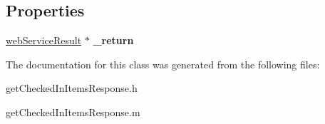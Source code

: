 \subsection*{Properties}
\begin{DoxyCompactItemize}
\item 
\hypertarget{interfaceget_checked_in_items_response_a16f5a028fc3f8d058b49b048bc9b56ba}{}\hyperlink{interfaceweb_service_result}{web\+Service\+Result} $\ast$ {\bfseries \+\_\+return}\label{interfaceget_checked_in_items_response_a16f5a028fc3f8d058b49b048bc9b56ba}

\end{DoxyCompactItemize}


The documentation for this class was generated from the following files\+:\begin{DoxyCompactItemize}
\item 
get\+Checked\+In\+Items\+Response.\+h\item 
get\+Checked\+In\+Items\+Response.\+m\end{DoxyCompactItemize}
